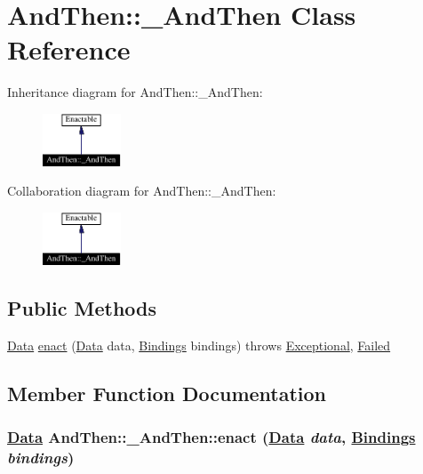 \hypertarget{classAndThen_1_1__AndThen}{
\section{And\-Then::\_\-And\-Then  Class Reference}
\label{classAndThen_1_1__AndThen}
}
Inheritance diagram for And\-Then::\_\-And\-Then:\begin{figure}[H]
\begin{center}
\leavevmode
\includegraphics[width=66pt]{classAndThen_1_1__AndThen__inherit__graph}
\end{center}
\end{figure}
Collaboration diagram for And\-Then::\_\-And\-Then:\begin{figure}[H]
\begin{center}
\leavevmode
\includegraphics[width=66pt]{classAndThen_1_1__AndThen__coll__graph}
\end{center}
\end{figure}
\subsection*{Public Methods}
\begin{CompactItemize}
\item 
\hyperlink{interfaceData}{Data} \hyperlink{classAndThen_1_1__AndThen_a0}{enact} (\hyperlink{interfaceData}{Data} data, \hyperlink{interfaceBindings}{Bindings} bindings) throws \hyperlink{classExceptional}{Exceptional}, \hyperlink{classFailed}{Failed}
\end{CompactItemize}


\subsection{Member Function Documentation}
\hypertarget{classAndThen_1_1__AndThen_a0}{
\subsubsection[enact]{\setlength{\rightskip}{0pt plus 5cm}\hyperlink{interfaceData}{Data} And\-Then::\_\-And\-Then::enact (\hyperlink{interfaceData}{Data} {\em data}, \hyperlink{interfaceBindings}{Bindings} {\em bindings})}}
\label{classAndThen_1_1__AndThen_a0}




